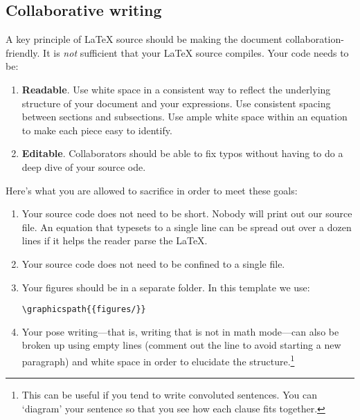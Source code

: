 \subsection{Collaborative writing}

A key principle of \LaTeX{} source should be making the document collaboration-friendly. It is \emph{not} sufficient that your \LaTeX{} source compiles. Your code needs to be:
\begin{enumerate}
	\item \textbf{Readable}. Use white space in a consistent way to reflect the underlying structure of your document and your expressions. Use consistent spacing between sections and subsections. Use ample white space within an equation to make each piece easy to identify. 
	\item \textbf{Editable}. Collaborators should be able to fix typos without having to do a deep dive of your source ode. 
\end{enumerate}
Here's what you are allowed to sacrifice in order to meet these goals:
\begin{enumerate}
	\item Your source code does not need to be short. Nobody will print out our source file. An equation that typesets to a single line can be spread out over a dozen lines if it helps the reader parse the \LaTeX{}. 
	\item Your source code does not need to be confined to a single file. 
	\item Your figures should be in a separate folder. In this template we use:
% 
\begin{lstlisting}[style=latexstyle]
\graphicspath{{figures/}}
\end{lstlisting}
% 
	\item Your pose writing---that is, writing that is not in math mode---can also be broken up using empty lines (comment out the line to avoid starting a new paragraph) and white space in order to elucidate the structure.\footnote{This can be useful if you tend to write convoluted sentences. You can `diagram' your sentence so that you see how each clause fits together.}
\end{enumerate}

